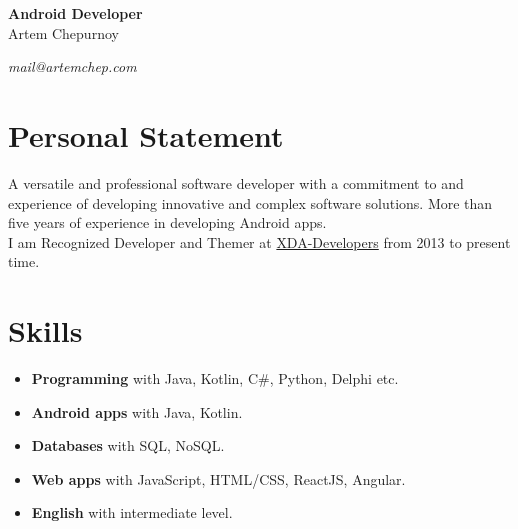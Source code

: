 \documentclass[a4paper]{article}
\begin{document}
	\begin{center}
		{\huge\bfseries Android Developer} \\[1em]
		{\Large Artem Chepurnoy} \\[1em]
		\myaddress
	\end{center}
	\vspace{1em}
	\textit{mail@artemchep.com} \hspace*{\fill} \textit{\myphone} 

	\section*{Personal Statement}
	A versatile and professional software developer with a commitment to and experience of developing innovative and complex software solutions. 
	More than five years of experience in developing Android apps. \\[1em]
	I am Recognized Developer and Themer at \href{https://forum.xda-developers.com/member.php?u=3685328}{XDA-Developers} from 2013 to present time.

	\section*{Skills}
	\begin{multicols}{2}
	\begin{itemize}
		\item \textbf{Programming} with Java, Kotlin, C\#, Python, Delphi etc.
		\item \textbf{Android apps} with Java, Kotlin.
		\item \textbf{Databases} with SQL, NoSQL.
		\item \textbf{Web apps} with JavaScript, HTML/CSS, ReactJS, Angular.
		\item \textbf{English} with intermediate level.
	\end{itemize}
	\end{multicols}
\end{document}
